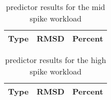 \begin{table}[H]
\centering
\begin{tabular}{| l | l | l |}
\hline
Type & RMSD & Percent \\ \hline

\end{tabular}
\caption{predictor results for the mid spike workload}
\end{table}

\begin{table}[H]
\centering
\begin{tabular}{| l | l | l |}
\hline
Type & RMSD & Percent \\ \hline

\end{tabular}
\caption{predictor results for the high spike workload}
\end{table}